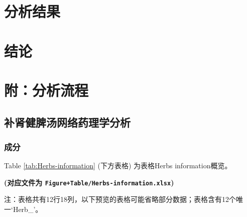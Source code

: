 \documentclass[
]{article}
\begin{document}
\hypertarget{results}{%
\section{分析结果}\label{results}}

\hypertarget{dis}{%
\section{结论}\label{dis}}

\hypertarget{workflow}{%
\section{附：分析流程}\label{workflow}}

\hypertarget{ux8865ux80beux5065ux813eux6c64ux7f51ux7edcux836fux7406ux5b66ux5206ux6790}{%
\subsection{补肾健脾汤网络药理学分析}\label{ux8865ux80beux5065ux813eux6c64ux7f51ux7edcux836fux7406ux5b66ux5206ux6790}}

\hypertarget{ux6210ux5206}{%
\subsubsection{成分}\label{ux6210ux5206}}

Table \ref{tab:Herbs-information} (下方表格) 为表格Herbs information概览。

\textbf{(对应文件为 \texttt{Figure+Table/Herbs-information.xlsx})}

\begin{center}\begin{tcolorbox}[colback=gray!10, colframe=gray!50, width=0.9\linewidth, arc=1mm, boxrule=0.5pt]注：表格共有12行18列，以下预览的表格可能省略部分数据；表格含有12个唯一`Herb\_'。
\end{tcolorbox}
\end{center}
\end{document}
